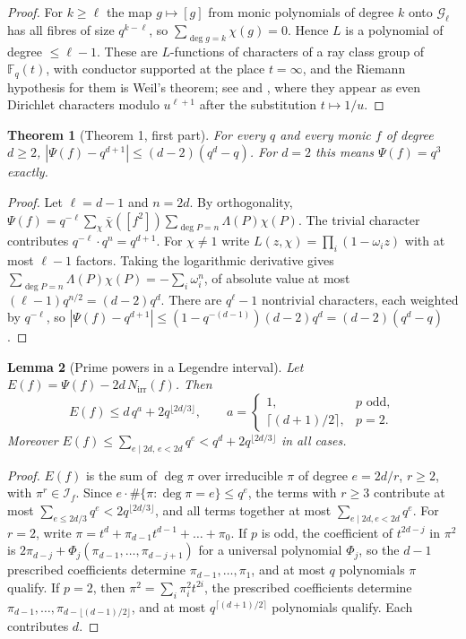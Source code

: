 \documentclass[11pt,a4paper]{article}
\newtheorem{theorem}{Theorem}[section]
\newtheorem{lemma}[theorem]{Lemma}
\theoremstyle{definition}
\theoremstyle{remark}
\newcommand{\Fq}{\mathbb{F}_q}
\newcommand{\Nirr}{N_{\mathrm{irr}}}
\newcommand{\cI}{\mathcal{I}}
\begin{document}
\begin{proof}
For $k\ge\ell$ the map $g\mapsto[g]$ from monic polynomials of degree $k$ onto $\mathcal G_\ell$ has
all fibres of size $q^{k-\ell}$, so $\sum_{\deg g=k}\chi(g)=0$. Hence $L$ is a polynomial of degree
$\le\ell-1$. These are $L$-functions of characters of a ray class group of $\Fq(t)$, with conductor
supported at the place $t=\infty$, and the Riemann hypothesis for them is Weil's theorem; see
\cite{Hayes1965} and \cite[\S4]{KR2014}, where they appear as even Dirichlet characters modulo
$u^{\ell+1}$ after the substitution $t\mapsto1/u$.
\end{proof}

\begin{theorem}[Theorem 1, first part]\label{thm:classical}
For every $q$ and every monic $f$ of degree $d\ge2$, $|\Psi(f)-q^{d+1}|\le(d-2)(q^d-q)$.
For $d=2$ this means $\Psi(f)=q^3$ exactly.
\end{theorem}

\begin{proof}
Let $\ell=d-1$ and $n=2d$. By orthogonality,
$\Psi(f)=q^{-\ell}\sum_\chi\bar\chi([f^2])\sum_{\deg P=n}\Lambda(P)\chi(P)$.
The trivial character contributes $q^{-\ell}\cdot q^{n}=q^{d+1}$. For $\chi\ne1$ write
$L(z,\chi)=\prod_{i}(1-\omega_iz)$ with at most $\ell-1$ factors. Taking the logarithmic
derivative gives $\sum_{\deg P=n}\Lambda(P)\chi(P)=-\sum_i\omega_i^n$, of absolute value at most
$(\ell-1)q^{n/2}=(d-2)q^d$. There are $q^\ell-1$ nontrivial characters, each weighted by $q^{-\ell}$, so
$|\Psi(f)-q^{d+1}|\le(1-q^{-(d-1)})(d-2)q^d=(d-2)(q^d-q)$.
\end{proof}

\begin{lemma}[Prime powers in a Legendre interval]\label{lem:E}
Let $E(f)=\Psi(f)-2d\,\Nirr(f)$. Then
\[
 E(f)\le d\,q^{a}+2q^{\lfloor 2d/3\rfloor},\qquad a=\begin{cases}1,& p \text{ odd},\\ \lceil (d+1)/2\rceil, & p=2.\end{cases}
\]
Moreover $E(f)\le\sum_{e\mid2d,\,e<2d}q^e<q^d+2q^{\lfloor2d/3\rfloor}$ in all cases.
\end{lemma}

\begin{proof}
$E(f)$ is the sum of $\deg\pi$ over irreducible $\pi$ of degree $e=2d/r$, $r\ge2$, with
$\pi^r\in\cI_f$. Since $e\cdot\#\{\pi:\deg\pi=e\}\le q^e$, the terms with $r\ge3$ contribute at most
$\sum_{e\le 2d/3}q^e<2q^{\lfloor2d/3\rfloor}$, and all terms together at most $\sum_{e\mid 2d,e<2d}q^e$.
For $r=2$, write $\pi=t^d+\pi_{d-1}t^{d-1}+\dots+\pi_0$. If $p$ is odd, the coefficient of
$t^{2d-j}$ in $\pi^2$ is $2\pi_{d-j}+\Phi_j(\pi_{d-1},\dots,\pi_{d-j+1})$ for a universal
polynomial $\Phi_j$, so the $d-1$ prescribed coefficients determine $\pi_{d-1},\dots,\pi_1$, and at
most $q$ polynomials $\pi$ qualify. If $p=2$, then $\pi^2=\sum_i\pi_i^2t^{2i}$, the prescribed
coefficients determine $\pi_{d-1},\dots,\pi_{d-\lfloor(d-1)/2\rfloor}$, and at most
$q^{\lceil(d+1)/2\rceil}$ polynomials qualify. Each contributes $d$.
\end{proof}
\end{document}
